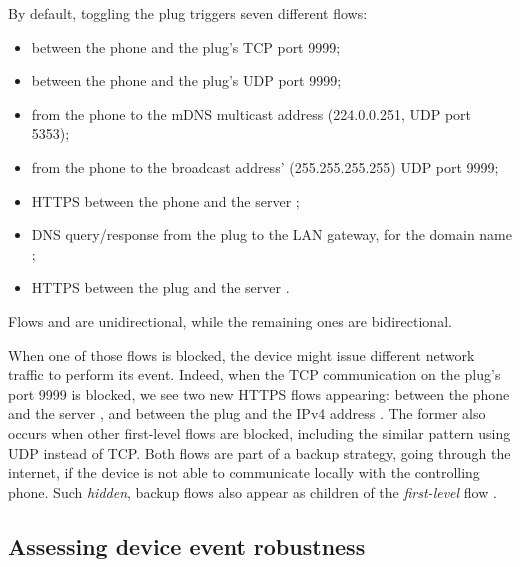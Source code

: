 By default, toggling the plug triggers seven different flows:
\begin{itemize}
  \item[\circled{A}] between the phone and the plug's TCP port 9999;
  \item[\circled{B}] between the phone and the plug's UDP port 9999;
  \item[\circled{C}] from the phone to the mDNS multicast address (224.0.0.251, UDP port 5353);
  \item[\circled{D}] from the phone to the broadcast address' (255.255.255.255) UDP port 9999;
  \item[\circled{E}] HTTPS between the phone and the server ;
  \item[\circled{F}] DNS query/response from the plug to the LAN gateway, for the domain name ;
  \item[\circled{G}] HTTPS between the plug and the server .
\end{itemize}
Flows  and  are unidirectional,
while the remaining ones are bidirectional.

When one of those flows is blocked,
the device might issue different network traffic to perform its event.
Indeed, when the TCP communication  on the plug's port 9999 is blocked,
we see two new HTTPS flows appearing:
between the phone and the server , and
between the plug and the IPv4 address .
The former also occurs when other first-level flows are blocked,
including the similar pattern using UDP instead of TCP.
Both flows are part of a backup strategy,
going through the internet,
if the device is not able to communicate locally with the controlling phone.
Such \emph{hidden}, backup flows also appear as children of the \emph{first-level} flow .


\subsection{Assessing device event robustness}
\label{sec:robustness}



